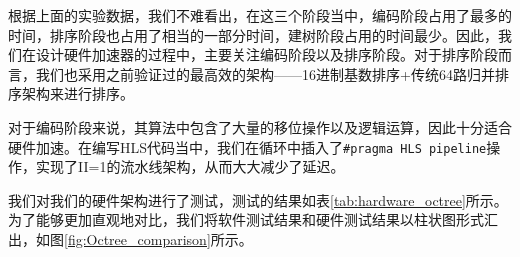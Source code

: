 \begin{table}[htbp]
\centering
\caption{不同大小数据集下使用C语言构建八叉树各阶段平均用时}
\label{tab:C_bottleneck}
\end{table}

根据上面的实验数据，我们不难看出，在这三个阶段当中，编码阶段占用了最多的时间，排序阶段也占用了相当的一部分时间，建树阶段占用的时间最少。因此，我们在设计硬件加速器的过程中，主要关注编码阶段以及排序阶段。对于排序阶段而言，我们也采用之前验证过的最高效的架构——16进制基数排序+传统64路归并排序架构来进行排序。

对于编码阶段来说，其算法中包含了大量的移位操作以及逻辑运算，因此十分适合硬件加速。在编写HLS代码当中，我们在循环中插入了\verb|#pragma HLS pipeline|操作，实现了II=1的流水线架构，从而大大减少了延迟。

我们对我们的硬件架构进行了测试，测试的结果如表\ref{tab:hardware_octree}所示。为了能够更加直观地对比，我们将软件测试结果和硬件测试结果以柱状图形式汇出，如图\ref{fig:Octree_comparison}所示。

\begin{table}[htbp]
\centering
\caption{不同大小数据集下使用硬件加速加速器构建八叉树各阶段用时}
\label{tab:hardware_octree}
\end{table}


